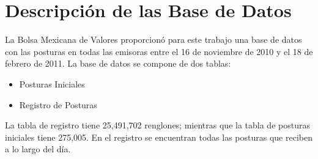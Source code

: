 \documentclass[10pt]{article}
\begin{document}
\thispagestyle{empty}
\tableofcontents
\newpage

\setcounter{page}{1}

\section{Descripción de las Base de Datos}
La Bolsa Mexicana de Valores proporcionó para este trabajo una base de datos con las posturas en todas las emisoras entre el 16 de noviembre de 2010 y el 18 de febrero de 2011. La base de datos se compone de dos tablas:

\begin{itemize}
  \item Posturas Iniciales
  \item Registro de Posturas
\end{itemize}

La tabla de registro tiene 25,491,702 renglones; mientras que la tabla de posturas iniciales tiene 275,005. En el registro se encuentran todas las posturas que reciben a lo largo del día.
\end{document}
